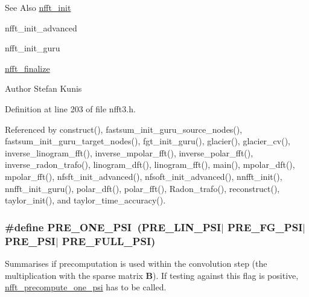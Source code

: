 \begin{DoxySeeAlso}{See Also}
\hyperlink{group__nfft_ga1dfeaf18f3735f035afa62ca768d99c4}{nfft\-\_\-init} 

nfft\-\_\-init\-\_\-advanced 

nfft\-\_\-init\-\_\-guru 

\hyperlink{group__nfft_ga614f9f7af5b0d5491afa9495393c4dc3}{nfft\-\_\-finalize} 
\end{DoxySeeAlso}
\begin{DoxyAuthor}{Author}
Stefan Kunis 
\end{DoxyAuthor}


Definition at line 203 of file nfft3.\-h.



Referenced by construct(), fastsum\-\_\-init\-\_\-guru\-\_\-source\-\_\-nodes(), fastsum\-\_\-init\-\_\-guru\-\_\-target\-\_\-nodes(), fgt\-\_\-init\-\_\-guru(), glacier(), glacier\-\_\-cv(), inverse\-\_\-linogram\-\_\-fft(), inverse\-\_\-mpolar\-\_\-fft(), inverse\-\_\-polar\-\_\-fft(), inverse\-\_\-radon\-\_\-trafo(), linogram\-\_\-dft(), linogram\-\_\-fft(), main(), mpolar\-\_\-dft(), mpolar\-\_\-fft(), nfsft\-\_\-init\-\_\-advanced(), nfsoft\-\_\-init\-\_\-advanced(), nnfft\-\_\-init(), nnfft\-\_\-init\-\_\-guru(), polar\-\_\-dft(), polar\-\_\-fft(), Radon\-\_\-trafo(), reconstruct(), taylor\-\_\-init(), and taylor\-\_\-time\-\_\-accuracy().

\hypertarget{group__nfft_ga44c85197c6bdcf4b632aeff5e94d5329}{
\subsubsection[{P\-R\-E\-\_\-\-O\-N\-E\-\_\-\-P\-S\-I}]{\setlength{\rightskip}{0pt plus 5cm}\#define P\-R\-E\-\_\-\-O\-N\-E\-\_\-\-P\-S\-I~({\bf P\-R\-E\-\_\-\-L\-I\-N\-\_\-\-P\-S\-I}$\vert$ {\bf P\-R\-E\-\_\-\-F\-G\-\_\-\-P\-S\-I}$\vert$ {\bf P\-R\-E\-\_\-\-P\-S\-I}$\vert$ {\bf P\-R\-E\-\_\-\-F\-U\-L\-L\-\_\-\-P\-S\-I})}}\label{group__nfft_ga44c85197c6bdcf4b632aeff5e94d5329}
Summarises if precomputation is used within the convolution step (the multiplication with the sparse matrix $\mathbf{B}$). If testing against this flag is positive, \hyperlink{group__nfft_gafd7b278b6ed04d929212b4807dd195f0}{nfft\-\_\-precompute\-\_\-one\-\_\-psi} has to be called.

